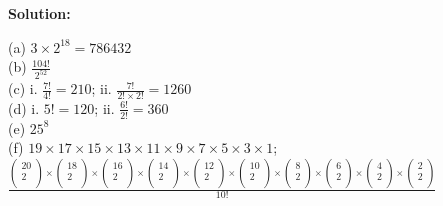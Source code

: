 \documentclass[12pt]{article}
\newenvironment{solution}{\par\noindent\textbf{Solution:}\par}{\par\vspace{1em}}
\begin{document}
\begin{solution}
    \noindent
    (a) $3\times 2^{18}=786432$\\
    (b) $\frac{104!}{2^{52}}$\\
    (c) i. $\frac{7!}{4!}=210$; ii. $\frac{7!}{2!\times 2!}=1260$\\
    (d) i. $5!=120$; ii. $\frac{6!}{2!}=360$\\
    (e) $25^8$\\
    (f) $19\times 17\times 15\times 13\times 11\times 9\times 7\times 5\times 3\times 1$;
    $\frac{\left( \begin{array}{c}
        20\\
        2\\
    \end{array} \right) \times \left( \begin{array}{c}
        18\\
        2\\
    \end{array} \right) \times \left( \begin{array}{c}
        16\\
        2\\
    \end{array} \right) \times \left( \begin{array}{c}
        14\\
        2\\
    \end{array} \right) \times \left( \begin{array}{c}
        12\\
        2\\
    \end{array} \right) \times \left( \begin{array}{c}
        10\\
        2\\
    \end{array} \right) \times \left( \begin{array}{c}
        8\\
        2\\
    \end{array} \right) \times \left( \begin{array}{c}
        6\\
        2\\
    \end{array} \right) \times \left( \begin{array}{c}
        4\\
        2\\
    \end{array} \right) \times \left( \begin{array}{c}
        2\\
        2\\
    \end{array} \right)}{10!}$
\end{solution}
\end{document}
